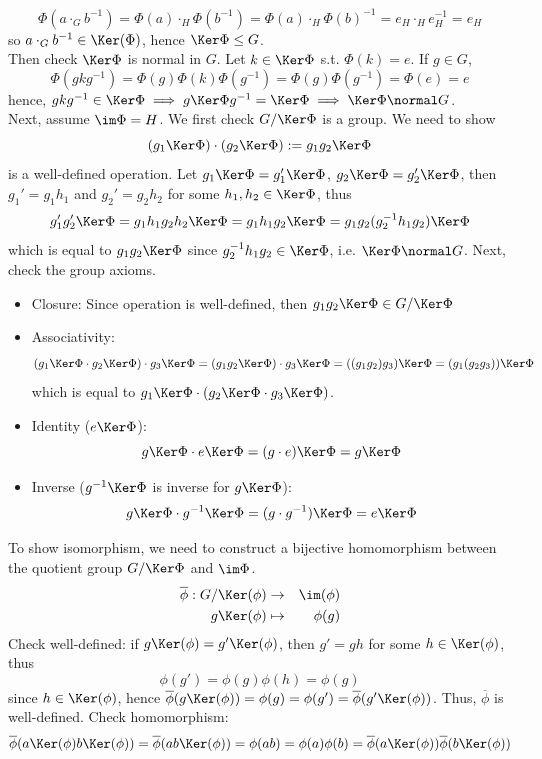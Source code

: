 \documentclass[a4paper]{article}
\begin{document}
\begin{ans}
\begin{enumerate}[label=(\roman*)]
$$\Phi(a\cdot_Gb^{-1})=\Phi(a)\cdot_H\Phi(b^{-1})=\Phi(a)\cdot_H\Phi(b)^{-1}=e_H\cdot_He_H^{-1}=e_H$$
so $a\cdot_Gb^{-1}\in\Ker(\Phi)$, hence $\Ker\Phi\leq G$.\\[5pt]
Then check $\Ker\Phi$ is normal in $G$. Let $k\in\Ker\Phi$ s.t. $\Phi(k)=e$. If $g\in G$,
$$\Phi(gkg^{-1})=\Phi(g)\Phi(k)\Phi(g^{-1})=\Phi(g)\Phi(g^{-1})=\Phi(e)=e$$
hence, $gkg^{-1}\in\Ker\Phi\implies g\Ker\Phi g^{-1}=\Ker\Phi\implies\Ker\Phi\normal G$.\\[5pt]
Next, assume $\im\Phi=H$. We first check $G/\Ker\Phi$ is a group. We need to show
$$(g_1\Ker\Phi)\cdot(g_2\Ker\Phi):=g_1g_2\Ker\Phi$$
is a well-defined operation. Let $g_1\Ker\Phi=g_1'\Ker\Phi$, $g_2\Ker\Phi=g_2'\Ker\Phi$, then $g_1'=g_1h_1$ and $g_2'=g_2h_2$ for some $h_1,h_2\in\Ker\Phi$, thus
$$g_1'g_2'\Ker\Phi=g_1h_1g_2h_2\Ker\Phi=g_1h_1g_2\Ker\Phi=g_1g_2(g_2^{-1}h_1g_2)\Ker\Phi$$
which is equal to $g_1g_2\Ker\Phi$ since $g_2^{-1}h_1g_2\in \Ker\Phi$, i.e. $\Ker\Phi\normal G$. Next, check the group axioms. 
\begin{itemize}
\item Closure: Since operation is well-defined, then $g_1g_2\Ker\Phi\in G/\Ker\Phi$
\item Associativity: $$(g_1\Ker\Phi\cdot g_2\Ker\Phi)\cdot g_3\Ker\Phi=(g_1g_2\Ker\Phi)\cdot g_3\Ker\Phi=((g_1g_2)g_3)\Ker\Phi=(g_1(g_2g_3))\Ker\Phi$$
which is equal to $g_1\Ker\Phi\cdot(g_2\Ker\Phi\cdot g_3\Ker\Phi)$. 
\item Identity ($e\Ker\Phi$): $$g\Ker\Phi\cdot e\Ker\Phi=(g\cdot e)\Ker\Phi=g\Ker\Phi$$
\item Inverse ($g^{-1}\Ker\Phi$ is inverse for $g\Ker\Phi$): $$g\Ker\Phi\cdot g^{-1}\Ker\Phi=(g\cdot g^{-1})\Ker\Phi=e\Ker\Phi$$
\end{itemize}
To show isomorphism, we need to construct a bijective homomorphism between the quotient group $G/\Ker\Phi$ and $\im\Phi$.
\begin{eqnarray}
\overline{\phi}:G/\Ker(\phi)&\rightarrow&\im(\phi)\nonumber\\g\Ker(\phi)&\mapsto&\phi(g)\nonumber
\end{eqnarray}
Check well-defined: if $g\Ker(\phi)=g'\Ker(\phi)$, then $g'=gh$ for some $h\in\Ker(\phi)$, thus
$$\phi(g')=\phi(g)\phi(h)=\phi(g)$$
since $h\in\Ker(\phi)$, hence $\overline{\phi}(g\Ker(\phi))=\phi(g)=\phi(g')=\overline{\phi}(g'\Ker(\phi))$. Thus, $\overline{\phi}$ is well-defined. Check homomorphism:
$$\overline{\phi}(a\Ker(\phi)b\Ker(\phi))=\overline{\phi}(ab\Ker(\phi))=\phi(ab)=\phi(a)\phi(b)=\overline{\phi}(a\Ker(\phi))\overline{\phi}(b\Ker(\phi))$$

\end{enumerate}
\end{ans}
\end{document}
